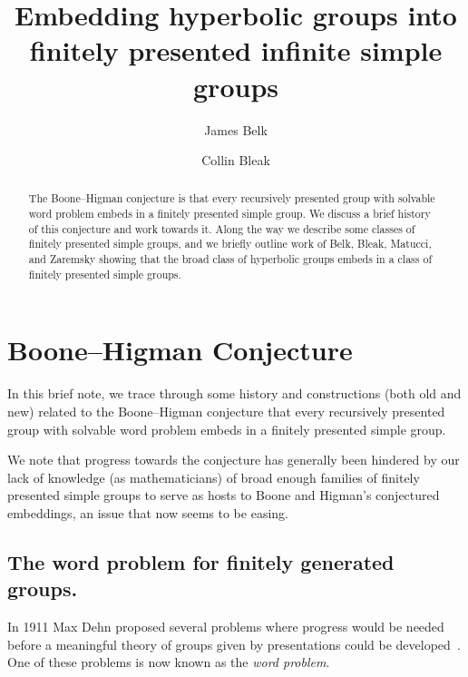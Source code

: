 \documentclass[usenames,dvipsnames]{amsart}
\theoremstyle{definition}
\begin{document}
\title[Hyperbolic into simple]{Embedding hyperbolic groups into finitely presented infinite simple groups}

\author[J.~Belk]{James Belk}
\address{School of Mathematics and Statistics, University of Glasgow, University Place, Glasgow, G128QQ, Scotland.}


\author[C.~Bleak]{Collin Bleak}
\address{School of Mathematics and Statistics, University of St Andrews, St Andrews, Scotland KY8 6ER.}


\maketitle

\begin{abstract} The Boone--Higman conjecture is that every recursively presented group with solvable word problem embeds in a finitely presented simple group.  We discuss a brief history of this conjecture and work towards it.  Along the way we describe some classes of finitely presented simple groups, and we briefly outline work of Belk, Bleak, Matucci, and Zaremsky showing that the broad class of hyperbolic groups embeds in a class of finitely presented simple groups.
\end{abstract}
 \section{Boone--Higman Conjecture}
 In this brief note, we trace through some history and constructions (both old and new) related to the Boone--Higman conjecture that every recursively presented group with solvable word problem embeds in a finitely presented simple group.

 We note that progress towards the conjecture has generally been hindered by our lack of knowledge (as mathematicians) of broad enough families of finitely presented simple groups to serve as hosts to Boone and Higman's conjectured embeddings, an issue that now seems to be easing.
 \subsection{The word problem for finitely generated groups.}

 In 1911 Max Dehn proposed several problems where progress would be needed before a meaningful theory of groups given by presentations could be developed~\cite{Dehn}.  One of these problems is now known as the \textit{word problem}.
\end{document}
